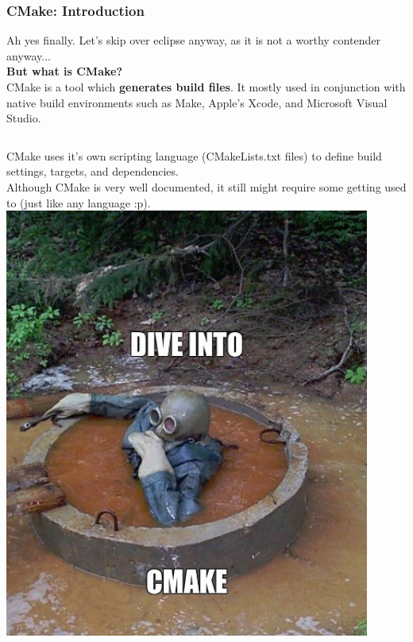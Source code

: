 \documentclass{beamer}
\begin{document}
\begin{frame}
\frametitle{CMake: Introduction}
Ah yes finally. Let's skip over eclipse anyway, as it is not a worthy contender anyway...\\ \bigskip
\textbf{But what is CMake?}\\
CMake is a tool which \textbf{generates build files}. It mostly used in conjunction with native build environments such as Make, Apple's Xcode, and Microsoft Visual Studio. \\
\begin{columns}
    CMake uses it's own scripting language (CMakeLists.txt files) to define build settings, targets, and dependencies.\\ \bigskip
    Although CMake is very well documented, it still might require some getting used to (just like any language :p).\\
    \includegraphics[width=0.9\textwidth]{figures/dive into cmake.jpg}
\end{columns}
\end{frame}
\end{document}
